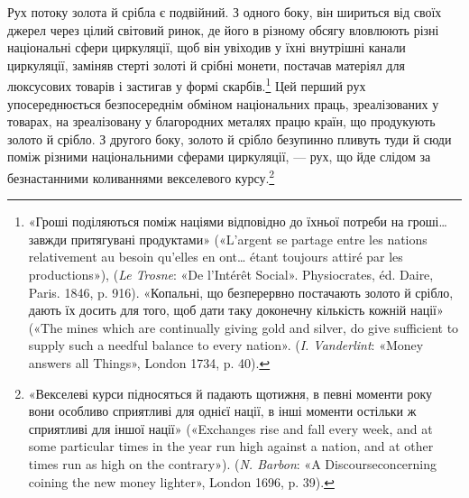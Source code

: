Рух потоку золота й срібла є подвійний. З одного боку, він
шириться від своїх джерел через цілий світовий ринок, де його
в різному обсягу вловлюють різні національні сфери циркуляції,
щоб він увіходив у їхні внутрішні канали циркуляції, заміняв
стерті золоті й срібні монети, постачав матеріял для люксусових
товарів і застигав у формі скарбів.\footnote{
«Гроші поділяються поміж націями відповідно до їхньої потреби
на гроші\dots{} завжди притягувані продуктами» («L’argent se partage
entre les nations relativement au besoin qu’elles en ont\dots{} étant toujours
attiré par les productions»), (\emph{Le Trosne}: «De l’Intérêt Social». Physiocrates,
éd. Daire, Paris. 1846, p. 916). «Копальні, що безперервно
постачають золото й срібло, дають їх досить для того, щоб дати таку
доконечну кількість кожній нації» («The mines which are continually giving
gold and silver, do give sufficient to supply such a needful balance to every
nation». (\emph{I. Vanderlint}: «Money answers all Things», London 1734, p. 40).
} Цей перший рух упосереднюється
безпосереднім обміном національних праць, зреалізованих
у товарах, на зреалізовану у благородних металях працю
країн, що продукують золото й срібло. З другого боку, золото
й срібло безупинно пливуть туди й сюди поміж різними національними
сферами циркуляції, — рух, що йде слідом за безнастанними
коливаннями векселевого курсу.\footnote{
«Векселеві курси підносяться й падають щотижня, в певні моменти
року вони особливо сприятливі для однієї нації, в інші моменти
остільки ж сприятливі для іншої нації» («Exchanges rise and fall every
week, and at some particular times in the year run high against a nation,
and at other times run as high on the contrary»). (\emph{N. Barbon}: «A Discourseconcerning
coining the new money lighter», London 1696, p. 39).
}

